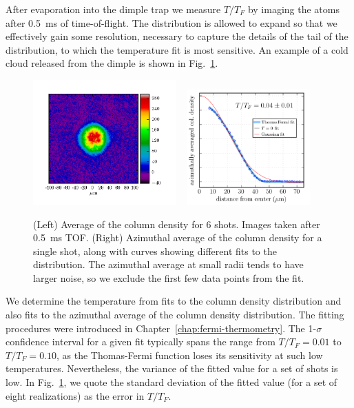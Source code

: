 After evaporation into the dimple trap we measure $T/T_{F}$ by imaging the
atoms after 0.5~ms of time-of-flight.   The distribution is allowed to expand
so that we effectively gain some resolution, necessary to capture the details
of the tail of the distribution, to which the temperature fit is most
sensitive.   An example of a cold cloud released from the dimple is shown in
Fig.~\ref{fig:cold}.  
\begin{figure}
    \centering
\includegraphics[width=0.49\textwidth]{../figures/evap/cold_coldens.png} ~
\includegraphics[width=0.42\textwidth]{../figures/evap/cold_az.png}
\caption{\small (Left) Average of the column density for 6 shots.  Images taken
after 0.5~ms TOF. (Right) Azimuthal average of the column density for a single
shot, along with curves showing different fits to the distribution. The
azimuthal average at small radii tends to have larger noise, so we exclude the
first few data points from the fit.  }
\label{fig:cold}
\end{figure}
We determine the temperature from fits to the column density distribution and
also fits to the azimuthal average of the column density distribution.  The
fitting procedures were introduced in Chapter~\ref{chap:fermi-thermometry}.
The 1-$\sigma$ confidence interval for a given fit typically spans the range
from $T/T_{F}=0.01$ to $T/T_{F}=0.10$, as the Thomas-Fermi function loses its
sensitivity at such low temperatures.  Nevertheless, the variance of the fitted
value for a set of shots is low.  In Fig.~\ref{fig:cold}, we quote the standard
deviation of the fitted value (for a set of eight realizations) as the error in
$T/T_{F}$. 

